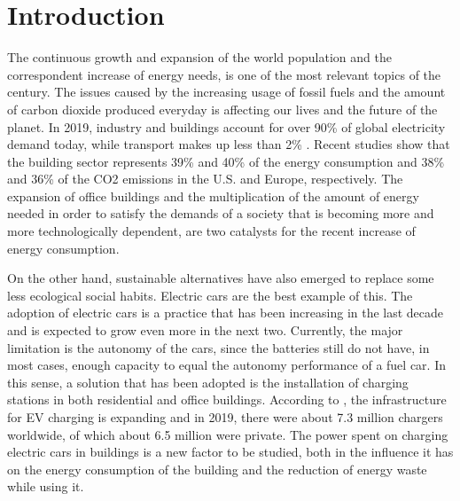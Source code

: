 \chapter{Introduction}
\label{chap:intro}

The continuous growth and expansion of the world population and the correspondent increase of energy needs, is one of the most relevant topics of the century. The issues caused by the increasing usage of fossil fuels and the amount of carbon dioxide produced everyday is affecting our lives and the future of the planet. In 2019, industry and buildings account for over 90\% of global electricity demand today, while transport makes up less than 2\% \cite{iea}. Recent studies show that the building sector represents 39\% and 40\% of the energy consumption and 38\% and 36\% of the CO2 emissions in the U.S. \cite{CivilUS} and Europe\cite{CivilEU}, respectively. The expansion of office buildings and the multiplication of the amount of energy needed in order to satisfy the demands of a society that is becoming more and more technologically dependent, are two catalysts for the recent increase of energy consumption. 



On the other hand, sustainable alternatives have also emerged to replace some less ecological social habits. Electric cars are the best example of this. The adoption of electric cars is a practice that has been increasing in the last decade and is expected to grow even more in the next two. Currently, the major limitation is the autonomy of the cars, since the batteries still do not have, in most cases, enough capacity to equal the autonomy performance of a fuel car. In this sense, a solution that has been adopted is the installation of charging stations in both residential and office buildings. According to \cite{charger}, the infrastructure for \ac{EV} charging is expanding and in 2019, there were about 7.3 million chargers worldwide, of which about 6.5 million were private. The power spent on charging electric cars in buildings is a new factor to be studied, both in the influence it has on the energy consumption of the building and the reduction of energy waste while using it.


